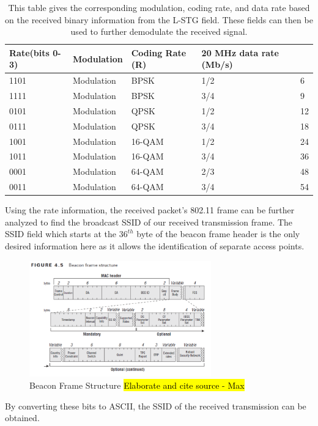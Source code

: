 \begin{table}[ht!]
	\centering
		\caption{This table gives the corresponding modulation, coding rate, and data rate based on the received binary information from the L-STG field. These fields can then be used to further demodulate the received signal.}
	\begin{tabular}{|l|l|l|l|l|}
		\hline
		Rate(bits 0-3) & Modulation & Coding Rate (R) & 20 MHz data rate (Mb/s) & \\
		\hline
		1101 & Modulation & BPSK & 1/2 & 6 \\
		1111 & Modulation & BPSK & 3/4 & 9 \\
		0101 & Modulation & QPSK & 1/2 & 12 \\
		0111 & Modulation & QPSK & 3/4 & 18 \\
		1001 & Modulation & 16-QAM & 1/2 & 24 \\
		1011 & Modulation & 16-QAM & 3/4 & 36 \\
		0001 & Modulation & 64-QAM & 2/3 & 48 \\
		0011 & Modulation & 64-QAM & 3/4 & 54 \\						
		\hline
	\end{tabular}
	\label{table:ofdm_rate_table}
\end{table} \par

Using the rate information, the received packet's 802.11 frame can be further analyzed to find the broadcast SSID of our received transmission frame. The SSID field which starts at the $36^{th}$ byte of the beacon frame header is the only desired information here as it allows the identification of separate access points.
\begin{figure}[ht!]
	\centering
	\includegraphics[width=0.70\textwidth]{img/beacon_frame}
	\caption{Beacon Frame Structure \hl{Elaborate and cite source - Max}}
	\label{fig:beacon_frame}
\end{figure}\par
By converting these bits to ASCII, the SSID of the received transmission can be obtained. \par

